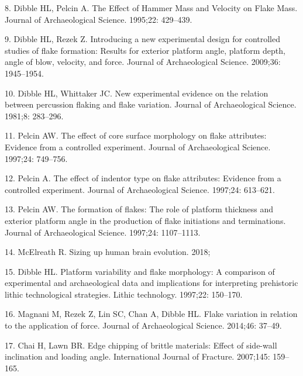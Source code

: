 \documentclass[10pt,letterpaper]{article}
\begin{document}
\leavevmode\hypertarget{ref-dibble_effect_1995}{}%
8. Dibble HL, Pelcin A. The Effect of Hammer Mass and Velocity on Flake
Mass. Journal of Archaeological Science. 1995;22: 429--439.

\leavevmode\hypertarget{ref-dibble_introducing_2009-1}{}%
9. Dibble HL, Rezek Z. Introducing a new experimental design for
controlled studies of flake formation: Results for exterior platform
angle, platform depth, angle of blow, velocity, and force. Journal of
Archaeological Science. 2009;36: 1945--1954.

\leavevmode\hypertarget{ref-dibble_new_1981-1}{}%
10. Dibble HL, Whittaker JC. New experimental evidence on the relation
between percussion flaking and flake variation. Journal of
Archaeological Science. 1981;8: 283--296.

\leavevmode\hypertarget{ref-pelcin_effect_1997}{}%
11. Pelcin AW. The effect of core surface morphology on flake
attributes: Evidence from a controlled experiment. Journal of
Archaeological Science. 1997;24: 749--756.

\leavevmode\hypertarget{ref-pelcin_effect_1997-1}{}%
12. Pelcin A. The effect of indentor type on flake attributes: Evidence
from a controlled experiment. Journal of Archaeological Science.
1997;24: 613--621.

\leavevmode\hypertarget{ref-pelcin_formation_1997}{}%
13. Pelcin AW. The formation of flakes: The role of platform thickness
and exterior platform angle in the production of flake initiations and
terminations. Journal of Archaeological Science. 1997;24: 1107--1113.

\leavevmode\hypertarget{ref-mcelreath_sizing_2018}{}%
14. McElreath R. Sizing up human brain evolution. 2018;

\leavevmode\hypertarget{ref-dibble_platform_1997}{}%
15. Dibble HL. Platform variability and flake morphology: A comparison
of experimental and archaeological data and implications for
interpreting prehistoric lithic technological strategies. Lithic
technology. 1997;22: 150--170.

\leavevmode\hypertarget{ref-magnani_flake_2014-1}{}%
16. Magnani M, Rezek Z, Lin SC, Chan A, Dibble HL. Flake variation in
relation to the application of force. Journal of Archaeological Science.
2014;46: 37--49.

\leavevmode\hypertarget{ref-chai_edge_2007}{}%
17. Chai H, Lawn BR. Edge chipping of brittle materials: Effect of
side-wall inclination and loading angle. International Journal of
Fracture. 2007;145: 159--165.
\end{document}
